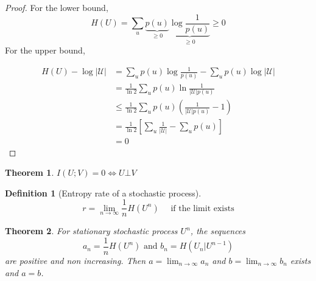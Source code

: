 \documentclass{article}
\newtheorem{theorem}{Theorem}[section]
\newtheorem{definition}{Definition}[section]
\theoremstyle{definition} %
\def\U{\mathcal{U}}
\begin{document}
\begin{proof}
For the lower bound,
  \[
    H(U) = \sum_u \underbrace{p(u)}_{\geq 0} \underbrace{\log \frac 1 {p(u)}}_{\geq 0} \geq 0
  \]
For the upper bound,

\begin{align*}
  H(U) - \log | \U |
  &= \sum_u p(u) \log \frac 1 {p(u)} - \sum_u p(u) \log |\U|\\
  &= \frac 1 {\ln 2} \sum_u p(u) \ln \frac 1 {|\U | p(u)}\\
  &\leq \frac 1 {\ln 2} \sum_u p(u) \left(\frac 1 {|\U | p(u)} - 1 \right)\\
  &=\frac 1 {\ln 2} \left[ \sum_u \frac 1 {|\U |} - \sum_u p(u) \right]\\
  &=0
\end{align*}
\end{proof}

\begin{theorem}
  $I(U;V) = 0 \iff U \bot V$
\end{theorem}


\begin{definition}[Entropy rate of a stochastic process]
\[
  r = \lim_{n\to \infty} \frac 1 n H(U^n) \quad \text{ if the limit exists}
\]
\end{definition}

\begin{theorem}
  For stationary stochastic process $U^n$, the sequences
  \[
    a_n = \frac 1 n H(U^n) \text{ and } b_n = H(U_n|U^{n-1})
  \]
  are positive and non increasing. Then $a=\lim_{n\to \infty} a_n$ and $b=\lim_{n\to \infty} b_n$ exists and $a=b$.
\end{theorem}
\end{document}

